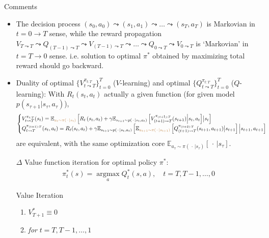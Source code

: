 Comments
\begin{itemize}[topsep=2pt,itemsep=0pt]
    \item The decision process $(s_0,a_0)\leadsto (s_1,a_1)\leadsto\ldots\leadsto (s_T,a_T) $
    is Markovian in $ t=0\to T $ sense, while the reward propagation $ V_{T\leadsto T}\leadsto Q_{(T-1)\leadsto T}\leadsto V_{(T-1)\leadsto T}\leadsto \ldots\leadsto Q_{0\leadsto T}\leadsto V_{0\leadsto T} $ is `Markovian' in $t= T\to 0 $ sense. i.e. solution to optimal $ \pi^* $ obtained by maximizing total reward should go backward.
    \item Duality of optimal $ \{V_{t\leadsto T}^{\pi_{t:T}}\}_{t=0}^T $ ($ V $-learning) and optimal $ \{Q_{t\leadsto T}^{\pi_{t:T}}\}_{t=0}^{T} $ ($ Q $-learning): With $ R_{t}(s_t,a_t) $ actually a given function (for given model $ p(s_{\tau+1}|s_\tau,a_\tau) $),
    \begin{align}
        \begin{cases}
            V_{t\leadsto T}^{\pi_{t:T}}(s_t)={\mathbb{E}_{\color{brown}a_t\sim \pi(\, \cdot \, |s_t)}\left[{R_{t}\left(s_t,a_t\right)+  \gamma\mathbb{E}_{s_{t+1}\sim p\left(\, \cdot \, |s_t,a_t\right)}\left[{\color{black}  V_{(t+1)\leadsto T}^{\pi_{(t+1):T}} (s_{t+1})} \Big| s_t,a_t \right]}  \big|s_t\right]}\\
            Q_{t\leadsto T}^{\pi_{(t+1):T}}(s_t,a_t)=R_t(s_t,a_t)+\gamma \mathbb{E}_{s_{t+1}\sim p\left(\, \cdot \, |s_t,a_t\right)}\left[ \mathbb{E}_{\color{brown}a_{t+1}\sim \pi(\, \cdot \, |s_{t+1})}\left[ Q_{(t+1)\leadsto T}^{\pi_{(t+2):T}}(s_{t+1},a_{t+1})  \big|s_{t+1}\right]  \Big| s_{t+1},a_{t+1}\right]
        \end{cases} 
    \end{align}
    are equivalent, with the same optimization core $ \mathbb{E}_{a_\tau\sim\pi(\, \cdot \, |s_\tau)}\left[ \, \cdot \,  |s_\tau \right]  $. 
    \item[$ \Delta  $] Value function iteration for optimal policy $ \pi^* $:
    \begin{align}
        \pi^*_t(s)=\mathop{\arg\max}\limits_{a} Q_t^*(s,a) ,\quad t=T,T-1,\ldots,0
    \end{align}
    \begin{algorithm}{Value Iteration}
        \begin{enumerate}[topsep=2pt,itemsep=2pt]
            \item $ V^*_{T+1}\equiv 0 $
            \item \textit{for} $ t=T,T-1,\ldots,1 $
            \begin{enumerate}[topsep=2pt,itemsep=2pt]

\end{enumerate}
\end{enumerate}
\end{algorithm}
\end{itemize}
